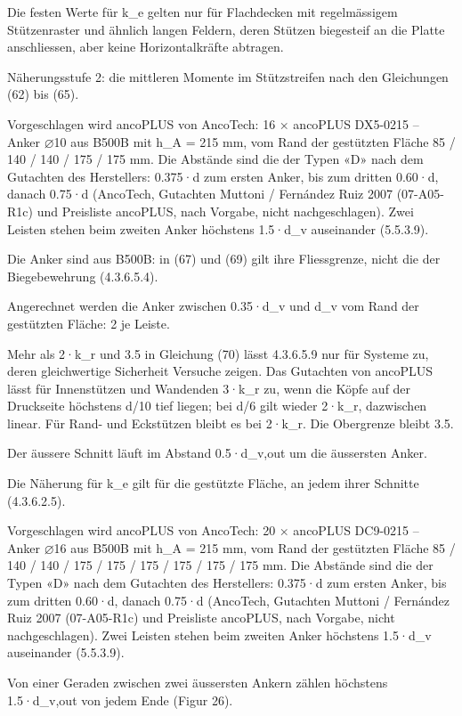 \documentclass[11pt,a4paper]{article}
\begin{document}
Die festen Werte für k\_e gelten nur für Flachdecken mit regelmässigem Stützenraster und ähnlich langen Feldern, deren Stützen biegesteif an die Platte anschliessen, aber keine Horizontalkräfte abtragen.

Näherungsstufe 2: die mittleren Momente im Stützstreifen nach den Gleichungen (62) bis (65).

Vorgeschlagen wird ancoPLUS von AncoTech: 16 × ancoPLUS DX5-0215 -- Anker ⌀10 aus B500B mit h\_A = 215 mm, vom Rand der gestützten Fläche 85 / 140 / 140 / 175 / 175 mm. Die Abstände sind die der Typen «D» nach dem Gutachten des Herstellers: 0.375·d zum ersten Anker, bis zum dritten 0.60·d, danach 0.75·d (AncoTech, Gutachten Muttoni / Fernández Ruiz 2007 (07-A05-R1c) und Preisliste ancoPLUS, nach Vorgabe, nicht nachgeschlagen). Zwei Leisten stehen beim zweiten Anker höchstens 1.5·d\_v auseinander (5.5.3.9).

Die Anker sind aus B500B: in (67) und (69) gilt ihre Fliessgrenze, nicht die der Biegebewehrung (4.3.6.5.4).

Angerechnet werden die Anker zwischen 0.35·d\_v und d\_v vom Rand der gestützten Fläche: 2 je Leiste.

Mehr als 2·k\_r und 3.5 in Gleichung (70) lässt 4.3.6.5.9 nur für Systeme zu, deren gleichwertige Sicherheit Versuche zeigen. Das Gutachten von ancoPLUS lässt für Innenstützen und Wandenden 3·k\_r zu, wenn die Köpfe auf der Druckseite höchstens d/10 tief liegen; bei d/6 gilt wieder 2·k\_r, dazwischen linear. Für Rand- und Eckstützen bleibt es bei 2·k\_r. Die Obergrenze bleibt 3.5.

Der äussere Schnitt läuft im Abstand 0.5·d\_v,out um die äussersten Anker.

Die Näherung für k\_e gilt für die gestützte Fläche, an jedem ihrer Schnitte (4.3.6.2.5).

Vorgeschlagen wird ancoPLUS von AncoTech: 20 × ancoPLUS DC9-0215 -- Anker ⌀16 aus B500B mit h\_A = 215 mm, vom Rand der gestützten Fläche 85 / 140 / 140 / 175 / 175 / 175 / 175 / 175 / 175 mm. Die Abstände sind die der Typen «D» nach dem Gutachten des Herstellers: 0.375·d zum ersten Anker, bis zum dritten 0.60·d, danach 0.75·d (AncoTech, Gutachten Muttoni / Fernández Ruiz 2007 (07-A05-R1c) und Preisliste ancoPLUS, nach Vorgabe, nicht nachgeschlagen). Zwei Leisten stehen beim zweiten Anker höchstens 1.5·d\_v auseinander (5.5.3.9).

Von einer Geraden zwischen zwei äussersten Ankern zählen höchstens 1.5·d\_v,out von jedem Ende (Figur 26).
\end{document}
